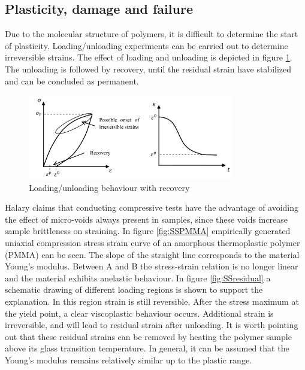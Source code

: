 \subsection{Plasticity, damage and failure}
Due to the molecular structure of polymers, it is difficult to determine the start of plasticity. Loading/unloading experiments can be carried out to determine irreversible strains.  The effect of loading and unloading is depicted in figure \ref{fig:Irr}. The unloading is followed by recovery, until the residual strain have stabilized and can be concluded as permanent.
\begin{figure}[htb]
    \centering
    \includegraphics[width=0.8\textwidth]{chapter_2/figures/Irr.PNG}
    \caption{Loading/unloading behaviour with recovery \cite{Appelsved2012InvestigationModels}}
    \label{fig:Irr}
\end{figure}
Halary \cite{Halary2011PolymerMaterials} claims that conducting compressive tests have the advantage of avoiding the effect of micro-voids always present in samples, since these voids increase sample brittleness on straining. In figure \ref{fig:SSPMMA} empirically generated uniaxial compression stress strain curve of an amorphous thermoplastic polymer (PMMA) can be seen. The slope of the straight line corresponds to the material Young's modulus. Between A and B the stress-strain relation is no longer linear and the material exhibits anelastic behaviour. In figure \ref{fig:SSresidual} a schematic drawing of different loading regions is shown to support the explanation. In this region strain is still reversible. After the stress maximum at the yield point, a clear viscoplastic behaviour occurs. Additional strain is irreversible, and will lead to residual strain after unloading. It is worth pointing out that these residual strains can be removed by heating the polymer sample above its glass transition temperature. In general, it can be assumed that the Young's modulus remains relatively similar up to the plastic range. 

